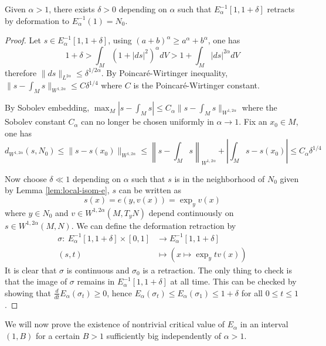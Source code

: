 \begin{proposition}[]
\label{prop:crit-val-1}
Given \(\alpha>1\), there exists \(\delta >0\) depending on \(\alpha\) such that \(E_\alpha^{-1}[1, 1+\delta]\) retracts by deformation to \(E_\alpha^{-1}(1) = N_0\).
\end{proposition}

\begin{proof}
Let \(s\in E_\alpha^{-1}[1, 1+\delta]\), using \((a+b)^\alpha \geq a^\alpha + b^\alpha\), one has
\[
 1 + \delta > \int_M (1+|ds|^2)^\alpha dV > 1 + \int_M |ds|^{2\alpha}dV
\]
therefore \(\|ds\|_{L^{2\alpha}}\leq \delta ^{1/{2\alpha}}\). By Poincaré-Wirtinger
inequality, \(\|s-\int_M s\|_{W^{1,2\alpha}}\leq C \delta^{1/4}\) where \(C\) is the
Poincaré-Wirtinger constant.

By Sobolev embedding, \(\max_M |s-\int_M s| \leq C_\alpha \|s -\int_M s\|_{W^{1,2\alpha}}\)
where the Sobolev constant \(C_\alpha\) can no longer be chosen uniformly in \(\alpha
\to 1\). Fix an \(x_0\in M\), one has
\[
 d_{W^{1,2\alpha}}(s, N_0) \leq \|s - s(x_0)\|_{W^{1,2\alpha}} \leq \left\|s-\int_M
s\right\|_{W^{1,2\alpha}} + \left|\int_M s - s(x_0)\right| \leq C_\alpha \delta^{1/4}
\]

Now choose \(\delta \ll 1\) depending on \(\alpha\) such that \(s\) is in the
neighborhood of \(N_0\) given by Lemma \ref{lem:local-isom-e}, \(s\) can be written as
\[
 s(x) = e(y,v(x)) = \exp_y v(x)
\]
where \(y\in N_0\) and \(v\in W^{1,2\alpha}(M, T_yN)\) depend continuously on \(s\in
W^{1,2\alpha}(M,N)\). We can define the deformation retraction by
\begin{align*}
  \sigma:\ E^{-1}_\alpha [1,1+\delta]\times [0,1] & \longrightarrow E^{-1}_\alpha[1,1+\delta]\\
  	   		 (s,t)		    	  &\longmapsto \left( x\mapsto \exp_y tv(x)\right)
\end{align*}
It is clear that \(\sigma\) is continuous and \(\sigma_0\) is a retraction. The only
thing to check is that the image of \(\sigma\) remains in \(E_\alpha^{-1}[1,1+\delta]\) at all time. This can be checked by showing that \(\frac{d}{dt}E_\alpha(\sigma_t) \geq
0\), hence \(E_\alpha(\sigma_t) \leq E_\alpha(\sigma_1) \leq 1+\delta\) for all \(0\leq
t\leq 1\).
\end{proof}

We will now prove the existence of nontrivial critical value of \(E_\alpha\) in an
interval \((1, B)\) for a certain \(B>1\) sufficiently big independently of \(\alpha
> 1\).

